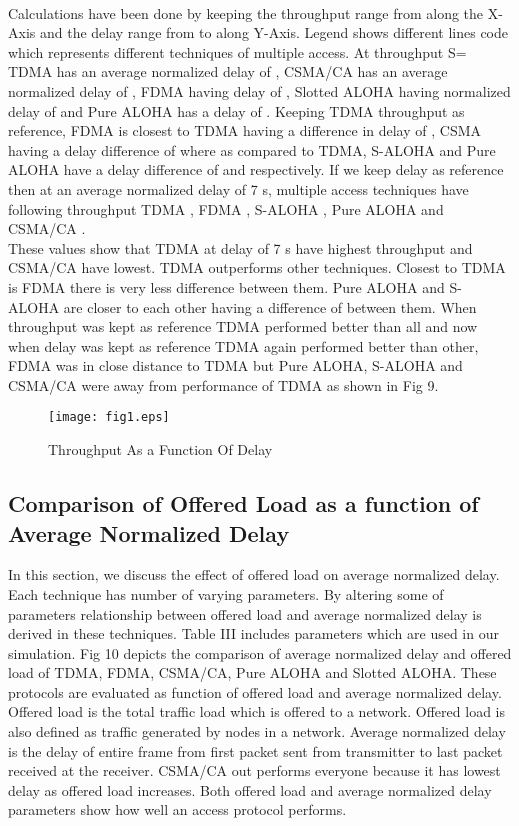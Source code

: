 \documentclass[11pt, conference, compsocconf, onecolumn]{IEEEtran}
\begin{document}
\\
\indent Calculations have been done by keeping the throughput range from    along the X-Axis and the delay range from  to  along Y-Axis. Legend shows different lines code which represents different techniques of multiple access. At throughput S= TDMA has an average normalized delay of , CSMA/CA has an average normalized delay of , FDMA having delay of , Slotted ALOHA having normalized delay of  and Pure ALOHA has a delay of . Keeping TDMA throughput as reference, FDMA is closest to TDMA having a difference in delay of , CSMA having a delay difference of  where as compared to TDMA, S-ALOHA and Pure ALOHA have a delay difference of  and  respectively. If we keep delay as reference then at an average normalized delay of 7 s, multiple access techniques have following throughput TDMA , FDMA , S-ALOHA , Pure ALOHA  and CSMA/CA .
\\
\indent These values show that TDMA at delay of 7 s have highest throughput and CSMA/CA have lowest. TDMA outperforms other techniques. Closest to TDMA is FDMA there is very less difference between them. Pure ALOHA and S-ALOHA are closer to each other having a difference of  between them. When throughput was kept as reference TDMA performed better than all and now when delay was kept as reference TDMA again performed better than other, FDMA was in close distance to TDMA but Pure ALOHA, S-ALOHA and CSMA/CA were away from performance of TDMA as shown in Fig 9.

\begin{figure}[!h]
\centering
\caption{Throughput As a Function Of Delay}
\texttt{[image: fig1.eps]}
\end{figure}

\subsection{Comparison of Offered Load as a function of Average Normalized Delay}
In this section, we discuss the effect of offered load on average normalized delay. Each technique has number of varying parameters. By altering some of parameters relationship between offered load and average normalized delay is derived in these techniques. Table III includes parameters which are used in our simulation. Fig 10 depicts the comparison of average normalized delay and offered load of TDMA, FDMA, CSMA/CA, Pure ALOHA and Slotted ALOHA. These protocols are evaluated as function of offered load and average normalized delay.
\\
\indent Offered load is the total traffic load which is offered to a network. Offered load is also defined as traffic generated by nodes in a network. Average normalized delay is the delay of entire frame from first packet sent from transmitter to last packet received at the receiver. CSMA/CA out performs everyone because it has lowest delay as offered load increases. Both offered load and average normalized delay parameters show how well an access protocol performs.
\end{document}
